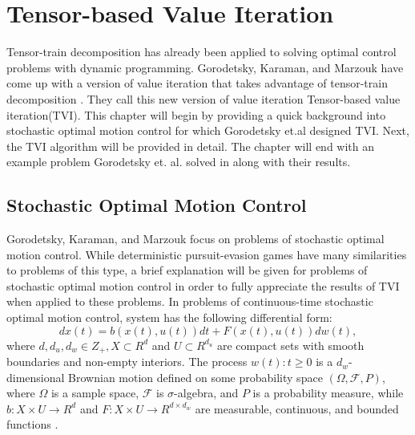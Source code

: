 \chapter{Tensor-based Value Iteration}\label{chp:tvi}

Tensor-train decomposition has already been applied to solving optimal control problems with dynamic programming. Gorodetsky, Karaman, and Marzouk have come up with a version of value iteration that takes advantage of tensor-train decomposition \cite{Gorod}. They call this new version of value iteration Tensor-based value iteration(TVI). This chapter will begin by providing a quick background into stochastic optimal motion control for which Gorodetsky et.al designed TVI. Next, the TVI algorithm will be provided in detail. The chapter will end with an example problem Gorodetsky et. al. solved in \cite{Gorod} along with their results. 

\section{Stochastic Optimal Motion Control}
Gorodetsky, Karaman, and Marzouk focus on problems of stochastic optimal motion control. While deterministic pursuit-evasion games have many similarities to problems of this type, a brief explanation will be given for problems of stochastic optimal motion control in order to fully appreciate the results of TVI when applied to these problems. In problems of continuous-time stochastic optimal motion control, system has the following differential form:
\begin{equation}\label{eqn7}
dx(t) = b(x(t),u(t))dt + F(x(t),u(t))dw(t),
\end{equation}
where $d,d_u,d_w \in Z_+, X \subset R^d$ and $U \subset R^{d_u}$ are compact sets with smooth  boundaries and non-empty interiors. The process ${w(t):t \geq 0}$ is a $d_w$-dimensional Brownian motion defined on some probability space $(\Omega, \mathscr{F},P)$, where $\Omega$ is a sample space, $\mathscr{F}$ is $\sigma$-algebra, and $P$ is a probability measure, while $b:X \times U \rightarrow R^d$ and $F: X \times U \rightarrow R^{d \times d_w}$ are measurable, continuous, and bounded functions \cite{Gorod}. 

